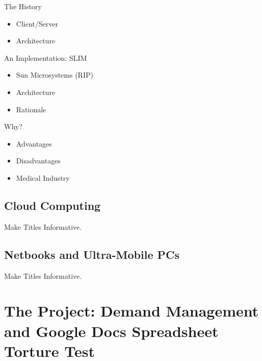 \documentclass{beamer}
\begin{document}
\begin{frame}{The History}
  \begin{itemize}
  \item Client/Server
  \item Architecture
  \end{itemize}
\end{frame}

\begin{frame}{An Implementation: SLIM}
  \begin{itemize}
  \item Sun Microsystems (RIP)
  \item Architecture
  \item Rationale
  \end{itemize}
\end{frame}

\begin{frame}{Why?}
  \begin{itemize}
  \item Advantages
  \item Disadvantages
  \end{itemize}
\end{frame}

\begin{frame}
  \begin{itemize}
  \item Medical Industry
  \end{itemize}
\end{frame}

\subsection{Cloud Computing}

\begin{frame}{Make Titles Informative.}
\end{frame}

\subsection{Netbooks and Ultra-Mobile PCs}

\begin{frame}{Make Titles Informative.}
\end{frame}

\section[Research Project]{The Project: Demand Management and Google Docs Spreadsheet Torture Test}
\end{document}
